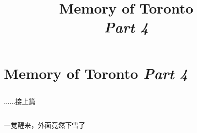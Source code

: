 ﻿\documentclass[hyperref={bookmarks=true},xcolor=pdflatex,svgnames,table,compress]{beamer}
\title{Memory of Toronto\\ \textit{Part 4}}
\author{}
\date{}
\begin{document}
\begin{frame}
\titlepage
\end{frame}

\section{Memory of Toronto {\itshape Part 4}}

\subsection{}
\begin{frame}
\begin{ztebox}
......接上篇
\end{ztebox}
\end{frame}

\subsection{}
\begin{frame}
\begin{center}
\end{center}
\end{frame}

\subsection{}
\begin{frame}
\begin{ztebox}
一觉醒来，外面竟然下雪了
\end{ztebox}
\end{frame}

\subsection{}
\begin{frame}
\end{frame}

\subsection{}
\begin{frame}
\end{frame}

\subsection{}
\begin{frame}
\end{frame}
\end{document}
